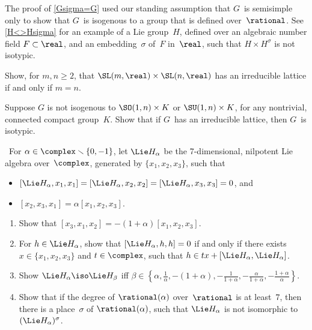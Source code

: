 \begin{rem} \label{Gsigma=GRems} 
The proof of \cref{Gsigma=G} used our standing assumption that $G$~is
semisimple only to show that $G$~is isogenous to a group
that is defined over~$\rational$. 
See \cref{H<>Hsigma} for an example of a Lie
group~$H$, defined over an algebraic number field $F \subset
\real$, and an embedding~$\sigma$ of~$F$ in~$\real$, such
that $H \times H^\sigma$ is not isotypic.
 \end{rem}


\begin{exercises}

\item Show, for $m,n \ge 2$, that $\SL(m,\real) \times
\SL(n,\real)$ has an irreducible lattice if and only if $m =
n$.

\item \label{irred<>isotypic(cpct)}
 Suppose $G$ is not isogenous to $\SO(1,n)
\times K$ or $\SU(1,n) \times K$, for any nontrivial,
connected compact group~$K$. Show that if $G$~has an
irreducible lattice, then $G$~is isotypic.

\item \label{H<>Hsigma} \optional\ 
 For $\alpha \in \complex \smallsetminus \{0,-1\}$, let
$\Lie H_\alpha$ be the 7-dimensional, nilpotent Lie algebra
over~$\complex$, generated by $\{x_1,x_2,x_3\}$, such that 
 \begin{itemize}
 \item $[\Lie H_\alpha, x_1,x_1] = [\Lie H_\alpha, x_2,x_2]
= [\Lie H_\alpha,x_3,x_3] = 0$, and
 \item $[x_2,x_3,x_1] = \alpha[x_1,x_2,x_3]$.
 \end{itemize}
 \begin{enumerate}
 \item Show that $[x_3,x_1,x_2] = -(1+\alpha) [x_1,x_2,x_3]$.
 \item For $h \in \Lie H_\alpha$, show that $[\Lie
H_\alpha,h,h] = 0$ if and only if there exists $x \in
\{x_1,x_2,x_3\}$ and $t \in \complex$, such that $h \in t x
+ [\Lie H_\alpha,\Lie H_\alpha]$.
 \item Show $\Lie H_\alpha \iso \Lie H_\beta$ iff 
 $\beta \in \left\{\alpha, \frac{1}{\alpha}, -(1+\alpha),
-\frac{1}{1+\alpha},
-\frac{\alpha}{1+\alpha}, -\frac{1+\alpha}{\alpha} \right\} $.
 \item Show that if the degree of $\rational(\alpha)$
over~$\rational$ is at least~$7$, then there is a
place~$\sigma$ of $\rational(\alpha)$,
such that $\Lie H_\alpha$ is not
isomorphic to $(\Lie H_\alpha)^\sigma$.  
 \end{enumerate}


\end{exercises}

